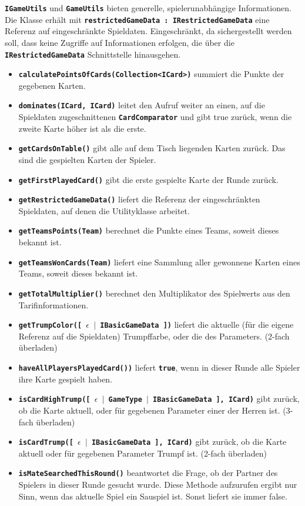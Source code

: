 \documentclass[
							a4paper, 
							11pt, 
							openany, 
							liststotoc,
							parskip=half, 
   							headings=normal
						]{scrreprt}
\begin{document}
{\textbf{\texttt{IGameUtils}} und \textbf{\texttt{GameUtils}} bieten generelle, spielerunabhängige Informationen. Die Klasse erhält mit \textbf{\texttt{restrictedGameData : IRestrictedGameData}} eine Referenz auf eingeschränkte Spieldaten. Eingeschränkt, da sichergestellt werden soll, dass keine Zugriffe auf Informationen erfolgen, die über die \textbf{\texttt{IRestrictedGameData}} Schnittstelle hinausgehen.
\begin{itemize}
	\item \textbf{\texttt{calculatePointsOfCards(Collection{\textless}ICard{\textgreater})}} summiert die Punkte der gegebenen Karten.
	\item \textbf{\texttt{dominates(ICard, ICard)}} leitet den Aufruf weiter an einen, auf die Spieldaten zugeschnittenen \textbf{\texttt{CardComparator}} und gibt true zurück, wenn die zweite Karte höher ist als die erste.
	\item \textbf{\texttt{getCardsOnTable()}} gibt alle auf dem Tisch liegenden Karten zurück. Das sind die gespielten Karten der Spieler.
	\item \textbf{\texttt{getFirstPlayedCard()}} gibt die erste gespielte Karte der Runde zurück.
	\item \textbf{\texttt{getRestrictedGameData()}} liefert die Referenz der eingeschränkten Spieldaten, auf denen die Utilityklasse arbeitet.
	\item \textbf{\texttt{getTeamsPoints(Team)}} berechnet die Punkte eines Teams, soweit dieses  bekannt ist.
	\item \textbf{\texttt{getTeamsWonCards(Team)}} liefert eine Sammlung aller gewonnene Karten eines Teams, soweit dieses bekannt ist.
	\item \textbf{\texttt{getTotalMultiplier()}} berechnet den Multiplikator des Spielwerts aus den Tarifinformationen.
	\item \textbf{\texttt{getTrumpColor([ $\epsilon$ $\mid$ IBasicGameData ])}} liefert die aktuelle (für die eigene Referenz auf die Spieldaten) Trumpffarbe, oder die des Parameters. (2-fach überladen)
	\item \textbf{\texttt{haveAllPlayersPlayedCard())}} liefert \textbf{\texttt{true}}, wenn in dieser Runde alle Spieler ihre Karte gespielt haben.
	\item \textbf{\texttt{isCardHighTrump([ $\epsilon$ $\mid$ GameType $\mid$ IBasicGameData ], ICard)}} gibt zurück, ob die Karte aktuell, oder für gegebenen Parameter einer der Herren ist. (3-fach überladen)
	\item \textbf{\texttt{isCardTrump([ $\epsilon$ $\mid$ IBasicGameData ], ICard)}} gibt zurück, ob die Karte aktuell oder für gegebenen Parameter Trumpf ist. (2-fach überladen)
	\item \textbf{\texttt{isMateSearchedThisRound()}} beantwortet die Frage, ob der Partner des Spielers in dieser Runde gesucht wurde. Diese Methode aufzurufen ergibt nur Sinn, wenn das aktuelle Spiel ein Sauspiel ist. Sonst liefert sie immer false.
\end{itemize}\bigskip

}
\end{document}

